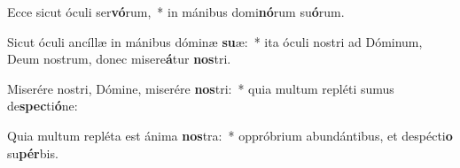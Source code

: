 \item Ecce sicut óculi ser\textbf{vó}rum,~* in mánibus domi\textbf{nó}rum su\textbf{ó}rum.
\item Sicut óculi ancíllæ in mánibus dóminæ \textbf{su}æ:~* ita óculi nostri ad Dóminum, Deum nostrum, donec misere\textbf{á}tur \textbf{nos}tri.
\item Miserére nostri, Dómine, miserére \textbf{nos}tri:~* quia multum repléti sumus de\textbf{spec}ti\textbf{ó}ne:
\item Quia multum repléta est ánima \textbf{nos}tra:~* oppróbrium abundántibus, et despécti\textbf{o} su\textbf{pér}bis.
